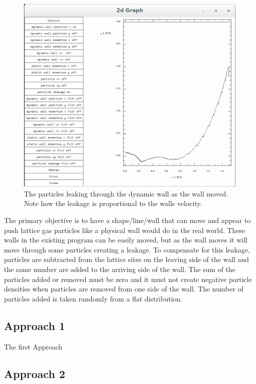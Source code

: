 \documentclass{article}
\begin{document}
\begin{figure}[H]
\includegraphics[scale=0.35]{A1p5.png}
\caption{\label{fig} The particles leaking through the dynamic wall as the wall moved. Note how the leakage is proportional to the walls velocity.}
\end{figure}
The primary objective is to have a shape/line/wall that can move and appear to push lattice gas particles like a physical wall would do in the real world. These walls in the existing program can be easily moved, but as the wall moves it will move through some particles creating a leakage. To compensate for this leakage, particles are subtracted from the lattice sites on the leaving side of the wall and the same number are added to the arriving side of the wall. The sum of the particles added or removed must be zero and it must not create negative particle densities when particles are removed from one side of the wall. The number of particles added is taken randomly from a flat distribution. 

\subsection{Approach 1}

The first Approach 

\subsection{Approach 2}
\end{document}
